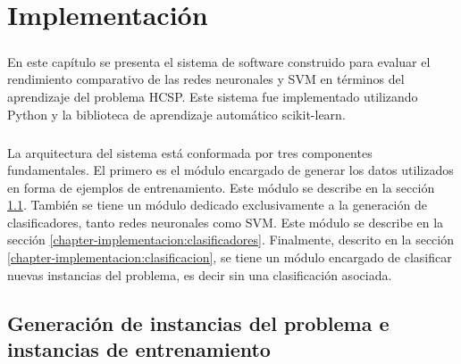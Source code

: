 \chapter{Implementación} \label{chapter-implementation}

\paragraph{} En este capítulo se presenta el sistema de software construido para evaluar el rendimiento comparativo de las redes neuronales y SVM en términos del aprendizaje del problema HCSP. Este sistema fue implementado utilizando Python y la biblioteca de aprendizaje automático scikit-learn.

\paragraph{} La arquitectura del sistema está conformada por tres componentes fundamentales. El primero es el módulo encargado de generar los datos utilizados en forma de ejemplos de entrenamiento. Este módulo se describe en la sección \ref{chapter-implementacion:data}. También se tiene un módulo dedicado exclusivamente a la generación de clasificadores, tanto redes neuronales como SVM. Este módulo se describe en la sección \ref{chapter-implementacion:clasificadores}. Finalmente, descrito en la sección \ref{chapter-implementacion:clasificacion}, se tiene un módulo encargado de clasificar nuevas instancias del problema, es decir sin una clasificación asociada.




\section{Generación de instancias del problema e instancias de entrenamiento} \label{chapter-implementacion:data}

